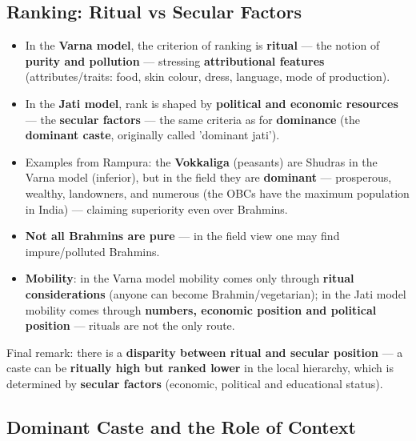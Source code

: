 \subsection{Ranking: Ritual vs Secular Factors}

\begin{KeyConcept}
\begin{itemize}
\item In the \textbf{Varna model}, the criterion of ranking is \textbf{ritual} --- the notion of \textbf{purity and pollution} --- stressing \textbf{attributional features} (attributes/traits: food, skin colour, dress, language, mode of production).
\item In the \textbf{Jati model}, rank is shaped by \textbf{political and economic resources} --- the \textbf{secular factors} --- the same criteria as for \textbf{dominance} (the \textbf{dominant caste}, originally called 'dominant jati').
\item Examples from Rampura: the \textbf{Vokkaliga} (peasants) are Shudras in the Varna model (inferior), but in the field they are \textbf{dominant} --- prosperous, wealthy, landowners, and numerous (the OBCs have the maximum population in India) --- claiming superiority even over Brahmins.
\item \textbf{Not all Brahmins are pure} --- in the field view one may find impure/polluted Brahmins.
\item \textbf{Mobility}: in the Varna model mobility comes only through \textbf{ritual considerations} (anyone can become Brahmin/vegetarian); in the Jati model mobility comes through \textbf{numbers, economic position and political position} --- rituals are not the only route.
\end{itemize}
\end{KeyConcept}

\begin{KeyConcept}
Final remark: there is a \textbf{disparity between ritual and secular position} --- a caste can be \textbf{ritually high but ranked lower} in the local hierarchy, which is determined by \textbf{secular factors} (economic, political and educational status).
\end{KeyConcept}

\subsection{Dominant Caste and the Role of Context}


